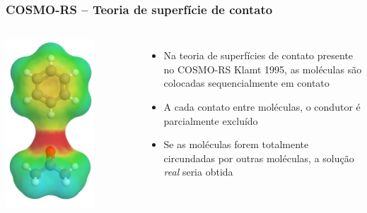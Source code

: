 \documentclass[aspectratio=169]{beamer}
\begin{document}
\begin{frame}
\frametitle{COSMO-RS -- Teoria de superfície de contato}
\begin{columns}[c]
\begin{center}
\includegraphics[width=0.7\textwidth]{img/contato2}
\end{center}
\begin{itemize}
    \item Na teoria de superfícies de contato presente no COSMO-RS Klamt 1995,
    	as moléculas são colocadas sequencialmente em contato \pause
    \item A cada contato entre moléculas, o condutor é parcialmente excluído
    \item Se as moléculas forem totalmente circundadas por outras moléculas, a solução \emph{real} seria obtida
\end{itemize}
\end{columns}
\end{frame}
\end{document}
